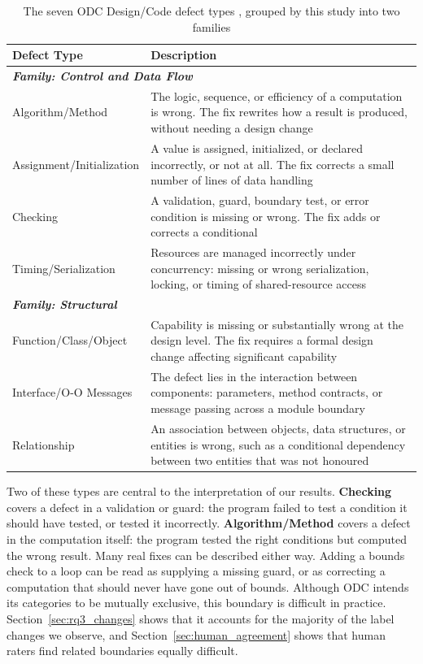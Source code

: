 \documentclass{iutbscthesis}
\begin{document}
\begin{table}[!htbp]
    \centering
    \begin{tabular}{l p{9.4cm}}
        \toprule
        \textbf{Defect Type} & \textbf{Description} \\
        \midrule
        \multicolumn{2}{l}{\textbf{\emph{Family: Control and Data Flow}}} \\
        \midrule
        Algorithm/Method & The logic, sequence, or efficiency of a computation is wrong. The fix rewrites how a result is produced, without needing a design change \\
        \addlinespace
        Assignment/\allowbreak Initialization & A value is assigned, initialized, or declared incorrectly, or not at all. The fix corrects a small number of lines of data handling \\
        \addlinespace
        Checking & A validation, guard, boundary test, or error condition is missing or wrong. The fix adds or corrects a conditional \\
        \addlinespace
        Timing/\allowbreak Serialization & Resources are managed incorrectly under concurrency: missing or wrong serialization, locking, or timing of shared-resource access \\
        \midrule
        \multicolumn{2}{l}{\textbf{\emph{Family: Structural}}} \\
        \midrule
        Function/\allowbreak Class/\allowbreak Object & Capability is missing or substantially wrong at the design level. The fix requires a formal design change affecting significant capability \\
        \addlinespace
        Interface/\allowbreak O-O Messages & The defect lies in the interaction between components: parameters, method contracts, or message passing across a module boundary \\
        \addlinespace
        Relationship & An association between objects, data structures, or entities is wrong, such as a conditional dependency between two entities that was not honoured \\
        \bottomrule
    \end{tabular}
    \caption{The seven ODC Design/Code defect types \cite{ibm2013odc, chillarege1992odc}, grouped by this study into two families}
    \label{tab:odc_types}
\end{table}

Two of these types are central to the interpretation of our results. \textbf{Checking} covers a defect in a validation or guard: the program failed to test a condition it should have tested, or tested it incorrectly. \textbf{Algorithm/Method} covers a defect in the computation itself: the program tested the right conditions but computed the wrong result. Many real fixes can be described either way. Adding a bounds check to a loop can be read as supplying a missing guard, or as correcting a computation that should never have gone out of bounds. Although ODC intends its categories to be mutually exclusive, this boundary is difficult in practice. Section~\ref{sec:rq3_changes} shows that it accounts for the majority of the label changes we observe, and Section~\ref{sec:human_agreement} shows that human raters find related boundaries equally difficult.
\end{document}
